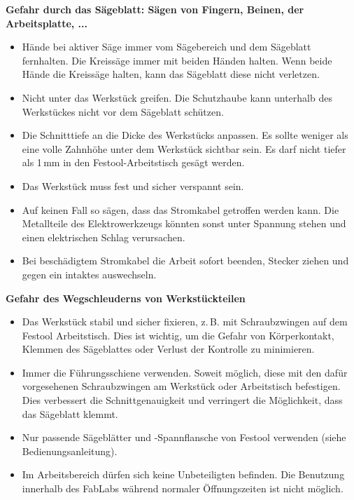 \documentclass{\basedir/fablab-document}
\begin{document}
\textbf{Gefahr durch das Sägeblatt: Sägen von Fingern, Beinen, der Arbeitsplatte, ...}
\begin{itemize}
\item Hände bei aktiver Säge immer vom Sägebereich und dem Sägeblatt fernhalten. Die Kreissäge immer mit beiden Händen halten. Wenn beide Hände die Kreissäge halten, kann das Sägeblatt diese nicht verletzen.

\item Nicht unter das Werkstück greifen. Die Schutzhaube kann unterhalb des Werkstückes nicht vor dem Sägeblatt schützen.

\item Die Schnitttiefe an die Dicke des Werkstücks anpassen. Es sollte weniger als eine volle Zahnhöhe unter dem Werkstück sichtbar sein. Es darf nicht tiefer als 1\,mm in den Festool-Arbeitstisch gesägt werden.

\item Das Werkstück muss fest und sicher verspannt sein.

\item Auf keinen Fall so sägen, dass das Stromkabel getroffen werden kann. Die Metallteile des Elektrowerkzeugs könnten sonst unter Spannung stehen und einen elektrischen Schlag verursachen.

\item Bei beschädigtem Stromkabel die Arbeit sofort beenden, Stecker ziehen und gegen ein intaktes auswechseln.
\end{itemize}

\textbf{Gefahr des Wegschleuderns von Werkstückteilen}
\begin{itemize}
\item Das Werkstück stabil und sicher fixieren, z.\,B. mit Schraubzwingen auf dem Festool Arbeitstisch. Dies ist wichtig,
um die Gefahr von Körperkontakt, Klemmen des Sägeblattes oder Verlust der Kontrolle zu minimieren.

\item Immer die Führungsschiene verwenden. Soweit möglich, diese mit den dafür vorgesehenen Schraubzwingen am Werkstück oder Arbeitstisch befestigen. Dies verbessert die Schnittgenauigkeit und verringert die Möglichkeit, dass das Sägeblatt klemmt.

\item Nur passende Sägeblätter und -Spannflansche von Festool verwenden (siehe Bedienungsanleitung).

\item Im Arbeitsbereich dürfen sich keine Unbeteiligten befinden. Die Benutzung innerhalb des FabLabs während normaler Öffnungszeiten ist nicht möglich.
\end{itemize}
\end{document}
